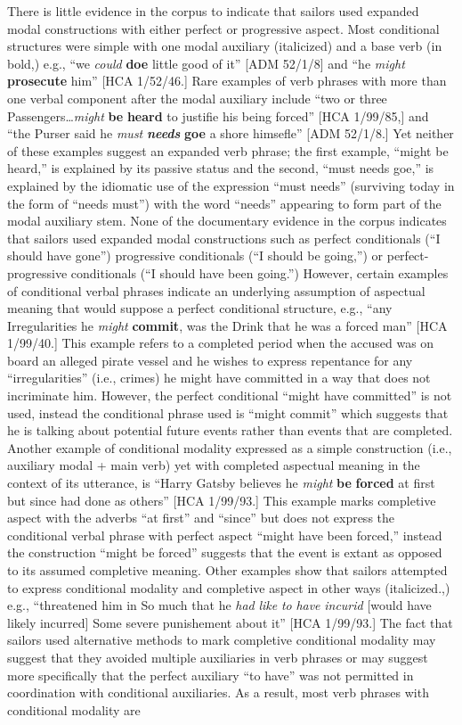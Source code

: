 There is little evidence in the corpus to indicate that sailors used expanded modal constructions with either perfect or progressive aspect. Most conditional structures were simple with one modal auxiliary (italicized) and a base verb (in bold,) e.g., “we \textit{could} \textbf{doe} little good of it” [ADM 52/1/8] and “he \textit{might} \textbf{prosecute} him” [HCA 1/52/46.] Rare examples of verb phrases with more than one verbal component after the modal auxiliary include “two or three Passengers…\textit{might} \textbf{be} \textbf{heard} to justifie his being forced” [HCA 1/99/85,] and “the Purser said he \textit{must} \textbf{\textit{needs}} \textbf{goe} a shore himsefle” [ADM 52/1/8.] Yet neither of these examples suggest an expanded verb phrase; the first example, “might be heard,” is explained by its passive status and the second, “must needs goe,” is explained by the idiomatic use of the expression “must needs” (surviving today in the form of “needs must”) with the word “needs” appearing to form part of the modal auxiliary stem. None of the documentary evidence in the corpus indicates that sailors used expanded modal constructions such as perfect conditionals (“I should have gone”) progressive conditionals (“I should be going,”) or perfect-progressive conditionals (“I should have been going.”) However, certain examples of conditional verbal phrases indicate an underlying assumption of aspectual meaning that would suppose a perfect conditional structure, e.g., “any Irregularities he \textit{might} \textbf{commit}, was the Drink that he was a forced man” [HCA 1/99/40.] This example refers to a completed period when the accused was on board an alleged pirate vessel and he wishes to express repentance for any “irregularities” (i.e., crimes) he might have committed in a way that does not incriminate him. However, the perfect conditional “might have committed” is not used, instead the conditional phrase used is “might commit” which suggests that he is talking about potential future events rather than events that are completed. Another example of conditional modality expressed as a simple construction (i.e., auxiliary modal + main verb) yet with completed aspectual meaning in the context of its utterance, is “Harry Gatsby believes he \textit{might} \textbf{be} \textbf{forced} at first but since had done as others” [HCA 1/99/93.] This example marks completive aspect with the adverbs “at first” and “since” but does not express the conditional verbal phrase with perfect aspect “might have been forced,” instead the construction “might be forced” suggests that the event is extant as opposed to its assumed completive meaning. Other examples show that sailors attempted to express conditional modality and completive aspect in other ways (italicized.,) e.g., “threatened him in So much that he \textit{had} \textit{like} \textit{to} \textit{have} \textit{incurid} [would have likely incurred] Some severe punishement about it” [HCA 1/99/93.] The fact that sailors used alternative methods to mark completive conditional modality may suggest that they avoided multiple auxiliaries in verb phrases or may suggest more specifically that the perfect auxiliary “to have” was not permitted in coordination with conditional auxiliaries. As a result, most verb phrases with conditional modality are 